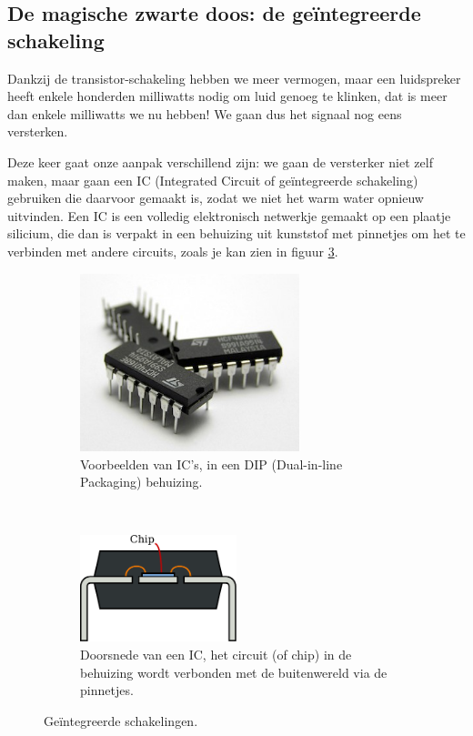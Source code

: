 \documentclass{article}
\begin{document}
		\subsection{De magische zwarte doos: de ge\"integreerde schakeling}
			Dankzij de transistor-schakeling hebben we meer vermogen, maar een luidspreker heeft enkele honderden milliwatts nodig om luid genoeg te klinken, dat is meer dan enkele milliwatts we nu hebben! We gaan dus het signaal nog eens versterken.

			Deze keer gaat onze aanpak verschillend zijn: we gaan de versterker niet zelf maken, maar gaan een IC (Integrated Circuit of ge\"integreerde schakeling) gebruiken die daarvoor gemaakt is, zodat we niet het warm water opnieuw uitvinden. Een IC is een volledig elektronisch netwerkje gemaakt op een plaatje silicium, die dan is verpakt in een behuizing uit kunststof met pinnetjes om het te verbinden met andere circuits, zoals je kan zien in figuur \ref{fig:IC}.

			\begin{figure}[htbp]
			\centering
				\begin{subfigure}[b]{0.45\linewidth}
					\centering
					\includegraphics[width=0.7\textwidth]{IC}
					\caption{Voorbeelden van IC's, in een DIP (Dual-in-line Packaging) behuizing.}
					\label{subfig:IC_foto}
				\end{subfigure}
				~
				\begin{subfigure}[b]{0.45\linewidth}
					\centering
				\includegraphics[width=0.5\textwidth]{IC_doorsnede}
				\caption{Doorsnede van een IC, het circuit (of chip) in de behuizing wordt verbonden met de buitenwereld via de pinnetjes. }
				\label{subfig:IC_doorsnede}
				\end{subfigure}
				\caption{Ge\"integreerde schakelingen.}
				\label{fig:IC}
			\end{figure}
\end{document}

